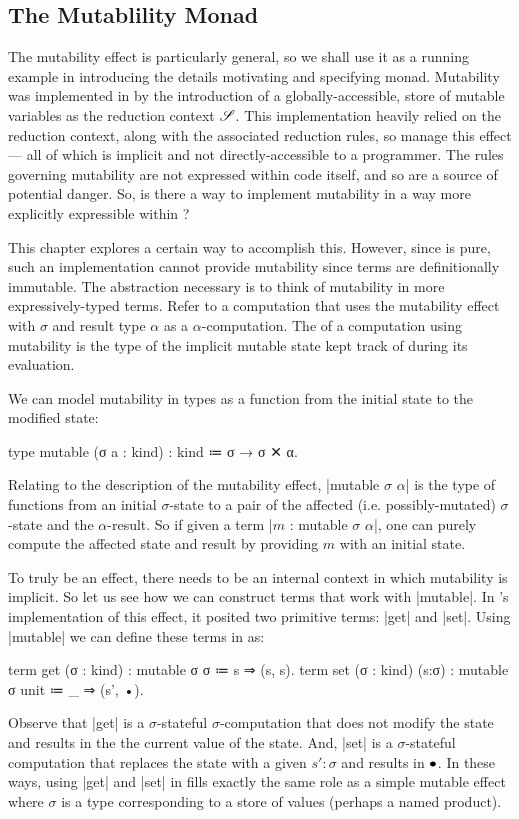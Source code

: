 \subsection{The Mutablility Monad}
\label{sec:demo-monad}

The mutability effect is particularly general, so we shall use it as a running example in introducing the details motivating and specifying monad.
Mutability was implemented in \LangB by the introduction of a globally-accessible, store of mutable variables as the reduction context $\mathscr{S}$.
This implementation heavily relied on the reduction context, along with the associated reduction rules, so manage this effect --- all of which is implicit and not directly-accessible to a programmer.
The rules governing mutability are not expressed within \LangB code itself, and so are a source of potential danger.
So, is there a way to implement mutability in a way more explicitly expressible within \LangA?

This chapter explores a certain way to accomplish this.
However, since \LangA is pure, such an implementation cannot provide  mutability since \LangA terms are definitionally immutable.
The abstraction necessary is to think of mutability in more expressively-typed terms.
Refer to a computation that uses the mutability effect with  $σ$ and result type $α$ as a  $α$-computation.
The  of a computation using mutability is the type of the implicit mutable state kept track of during its evaluation.

We can model mutability in \LangA types as a function from the initial state to the modified state:
\begin{program}
type mutable (σ a : kind) : kind ≔ σ → σ ✕ α.
\end{program}
Relating to the description of the mutability effect, \code|mutable $σ$ $α$| is the type of functions from an initial $σ$-state to a pair of the affected (i.e. possibly-mutated) $σ$-state and the $α$-result.
So if given a term \code|$m$ : mutable $σ$ $α$|,
one can purely compute the affected state and result by providing $m$ with an initial state.

To truly be an effect, there needs to be an internal context in which mutability is implicit.
So let us see how we can construct terms that work with \code|mutable|.
In \LangB's implementation of this effect, it posited two primitive terms: \code|get| and \code|set|.
Using \code|mutable| we can define these terms in \LangA as:
\begin{snippet}
term get (σ : kind)       : mutable σ σ    ≔ s ⇒ (s, s).
term set (σ : kind) (s:σ) : mutable σ unit ≔ _ ⇒ (s', •).
\end{snippet}
Observe that
\code|get| is a $σ$-stateful $σ$-computation that does not modify the state and results in the the current value of the state.
And, \code|set| is a $σ$-stateful computation that replaces the state with a given $s':σ$ and results in $\bullet$.
In these ways, using \code|get| and \code|set| in \LangA fills exactly the same role as a simple \LangB mutable effect where $σ$ is a type corresponding to a store of values (perhaps a named product).

